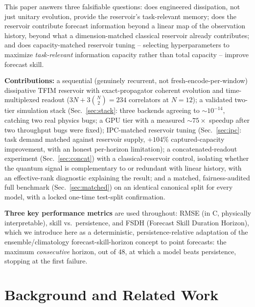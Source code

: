 \documentclass[11pt,twocolumn]{article}
\begin{document}
This paper answers three falsifiable questions: does engineered dissipation, not just unitary
evolution, provide the reservoir's task-relevant memory; does the reservoir contribute forecast
information beyond a linear map of the observation history, beyond what a dimension-matched
classical reservoir already contributes; and does capacity-matched reservoir tuning -- selecting
hyperparameters to maximize \emph{task-relevant} information capacity rather than total capacity
-- improve forecast skill.

\textbf{Contributions:} a sequential (genuinely recurrent, not fresh-encode-per-window)
dissipative TFIM reservoir with exact-propagator coherent evolution and time-multiplexed readout
($3N+3\binom{N}{2}{=}234$ correlators at $N{=}12$); a validated two-tier simulation stack
(Sec.~\ref{sec:stack}: three backends agreeing to $\sim\!10^{-14}$, catching two real physics
bugs; a GPU tier with a measured $\sim\!75\times$ speedup after two throughput bugs were fixed);
IPC-matched reservoir tuning (Sec.~\ref{sec:ipc}: task demand matched against reservoir supply,
$+104\%$ captured-capacity improvement, with an honest per-horizon limitation); a
concatenated-readout experiment (Sec.~\ref{sec:concat}) with a classical-reservoir control,
isolating whether the quantum signal is complementary to or redundant with linear history, with
an effective-rank diagnostic explaining the result; and a matched, fairness-audited full
benchmark (Sec.~\ref{sec:matched}) on an identical canonical split for every model, with a
locked one-time test-split confirmation.

\textbf{Three key performance metrics} are used throughout: RMSE (in \textdegree C, physically
interpretable), skill vs.\ persistence, and FSDH (Forecast Skill Duration Horizon), which we
introduce here as a deterministic, persistence-relative adaptation of the ensemble/climatology
forecast-skill-horizon concept \cite{buizza2015} to point forecasts: the maximum \emph{consecutive}
horizon, out of 48, at which a model beats persistence, stopping at the first failure.

\section{Background and Related Work}
\end{document}

